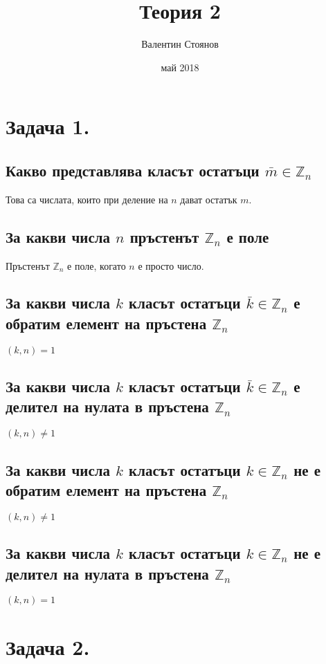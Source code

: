\documentclass[10pt]{article}
\newcommand*{\Z}{\mathbb{Z}}
\begin{document}
\title{Теория 2}
\author{Валентин Стоянов}
\date{май 2018}
\maketitle

\section*{Задача 1.}

\subsection*{Какво представлява класът остатъци $\bar{m} \in \Z_n$}
Това са числата, които при деление на $n$ дават остатък $m$.

\subsection*{За какви числа $n$ пръстенът $\Z_n$ е поле}
Пръстенът $\Z_n$ е поле, когато $n$ е просто число.

\subsection*{За какви числа $k$ класът остатъци $\bar{k} \in \Z_n$ е обратим елемент на пръстена $\Z_n$}
$(k, n) = 1$ 

\subsection*{За какви числа $k$ класът остатъци $\bar{k} \in \Z_n$ е делител на нулата в пръстена $\Z_n$}
$(k, n) \neq 1$ 

\subsection*{За какви числа $k$ класът остатъци $k \in \Z_n$ не е обратим елемент на пръстена $\Z_n$}
$(k, n) \neq 1$ 

\subsection*{За какви числа $k$ класът остатъци $k \in \Z_n$ не е делител на нулата в пръстена $\Z_n$}
$(k, n) = 1$

\section*{Задача 2.}
\end{document}
